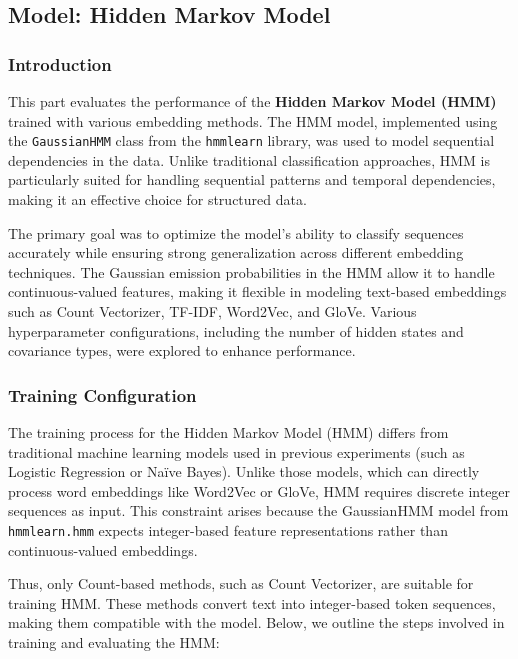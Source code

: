 \subsection{Model: Hidden Markov Model}

\subsubsection{Introduction}

This part evaluates the performance of the \textbf{Hidden Markov Model (HMM)} trained with various embedding methods. The HMM model, implemented using the \texttt{GaussianHMM} class from the \texttt{hmmlearn} library, was used to model sequential dependencies in the data. Unlike traditional classification approaches, HMM is particularly suited for handling sequential patterns and temporal dependencies, making it an effective choice for structured data. 

The primary goal was to optimize the model's ability to classify sequences accurately while ensuring strong generalization across different embedding techniques. The Gaussian emission probabilities in the HMM allow it to handle continuous-valued features, making it flexible in modeling text-based embeddings such as Count Vectorizer, TF-IDF, Word2Vec, and GloVe. Various hyperparameter configurations, including the number of hidden states and covariance types, were explored to enhance performance.


\subsubsection{Training Configuration}

The training process for the Hidden Markov Model (HMM) differs from traditional machine learning models used in previous experiments (such as Logistic Regression or Naïve Bayes). Unlike those models, which can directly process word embeddings like Word2Vec or GloVe, HMM requires discrete integer sequences as input. This constraint arises because the GaussianHMM model from \texttt{hmmlearn.hmm} expects integer-based feature representations rather than continuous-valued embeddings. 

Thus, only Count-based methods, such as Count Vectorizer, are suitable for training HMM. These methods convert text into integer-based token sequences, making them compatible with the model. Below, we outline the steps involved in training and evaluating the HMM:

